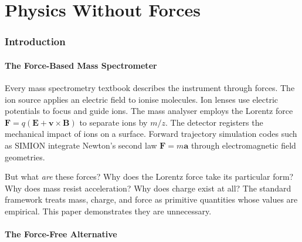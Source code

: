 \documentclass[11pt,twocolumn,a4paper]{article}
\theoremstyle{definition}
\theoremstyle{remark}
\begin{document}
\begin{abstract}
\medskip
\noindent\textbf{Keywords:} force-free mass spectrometry, partition depth minimisation, GPU fragment shaders, categorical state propagation, partition Lagrangian, partition creation, partition completion, phase-locked networks, partition lag, six-pass architecture
\end{abstract}

\tableofcontents
\newpage


\part{Physics Without Forces}

\section{Introduction}
\label{sec:introduction}

\subsection{The Force-Based Mass Spectrometer}

Every mass spectrometry textbook \citep{gross2017, march2005} describes the instrument through forces. The ion source applies an electric field to ionise molecules. Ion lenses use electric potentials to focus and guide ions. The mass analyser employs the Lorentz force $\mathbf{F} = q(\mathbf{E} + \mathbf{v} \times \mathbf{B})$ to separate ions by $m/z$. The detector registers the mechanical impact of ions on a surface. Forward trajectory simulation codes such as SIMION \citep{dahl2000simion} integrate Newton's second law $\mathbf{F} = m\mathbf{a}$ through electromagnetic field geometries.

But what \emph{are} these forces? Why does the Lorentz force take its particular form? Why does mass resist acceleration? Why does charge exist at all? The standard framework treats mass, charge, and force as primitive quantities whose values are empirical. This paper demonstrates they are unnecessary.

\subsection{The Force-Free Alternative}
\end{document}
